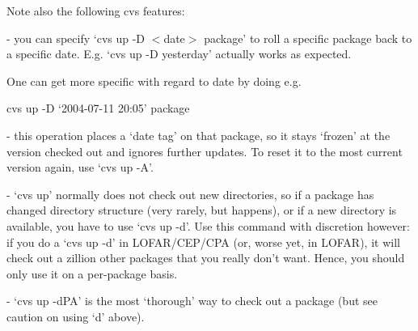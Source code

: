 \documentclass[10pt]{article}
\begin{document}
Note also the following cvs features:

- you can specify `cvs up -D $<$date$>$ package' to roll a specific package
back to a specific date. E.g. `cvs up -D yesterday' actually works as
expected.

One can get more specific with regard to date by doing e.g.

 cvs up -D `2004-07-11 20:05' package

- this operation places a `date tag' on that package, so it stays `frozen'
at the version checked out and ignores further updates. To reset it to the
most current version again, use `cvs up -A'.

- `cvs up' normally does not check out new directories, so if a package has
changed directory structure (very rarely, but happens), or if a new
directory is available, you have to use `cvs up -d'. Use this command with
discretion however: if you do a `cvs up -d' in LOFAR/CEP/CPA (or, worse yet,
in LOFAR), it will check out a zillion other packages that you really don't
want. Hence, you should only use it on a per-package basis.

- `cvs up -dPA' is the most `thorough' way to check out a package (but see
caution on using `d' above).
  
\end{document}
